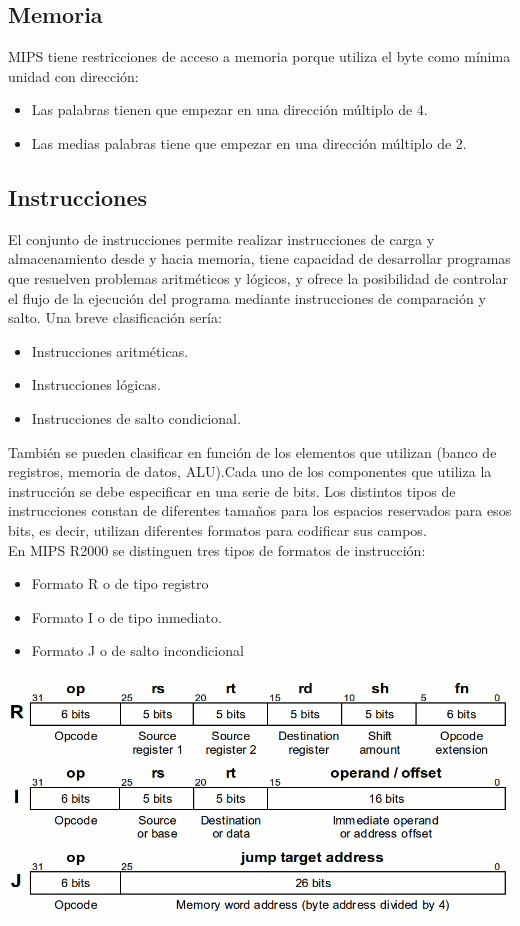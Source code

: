 \documentclass[12pt]{article}
\begin{document}
\subsection{Memoria}
MIPS tiene restricciones de acceso a memoria porque utiliza el byte como mínima unidad con dirección:
\begin{itemize}
\item Las palabras tienen que empezar en una dirección múltiplo de 4.
\item Las medias palabras tiene que empezar en una dirección múltiplo de 2.
\end{itemize}
\subsection{Instrucciones}
El conjunto de instrucciones permite realizar instrucciones de carga y almacenamiento
desde y hacia memoria, tiene capacidad de desarrollar programas que resuelven problemas aritméticos y lógicos, y ofrece la posibilidad de controlar el flujo de la ejecución del programa mediante instrucciones de comparación y salto.
Una breve clasificación sería:
\begin{itemize}
\item Instrucciones aritméticas.
\item Instrucciones lógicas.
\item Instrucciones de salto condicional.
\end{itemize}
También se pueden clasificar en función de los elementos que utilizan (banco de registros, memoria de datos, ALU).Cada uno de los componentes que utiliza la instrucción se debe especificar en una serie de bits. Los distintos tipos de instrucciones
constan de diferentes tamaños para los espacios reservados para esos bits, es decir, utilizan diferentes formatos para codificar sus campos.\\
En MIPS R2000 se distinguen tres tipos de formatos de instrucción:
\begin{itemize}
\item Formato R o de tipo registro
\item Formato I o de tipo inmediato.
\item Formato J o de salto incondicional
\end{itemize}
\begin{center}
\includegraphics[width=\textwidth,keepaspectratio]{formatos.png}
\end{center}
\end{document}
